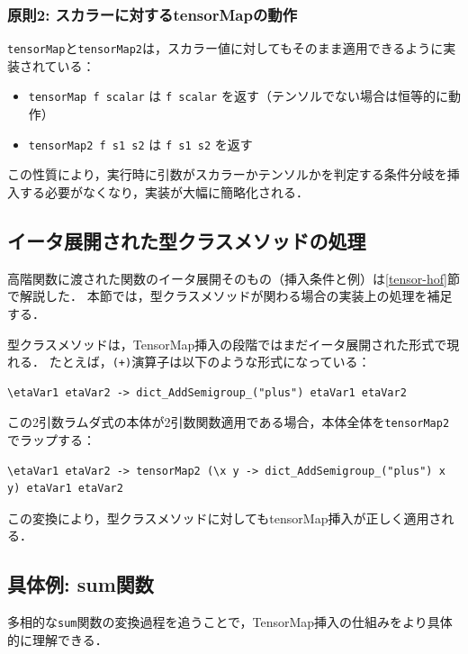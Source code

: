 \subsubsection{原則2: スカラーに対するtensorMapの動作}

\lstinline{tensorMap}と\lstinline{tensorMap2}は，スカラー値に対してもそのまま適用できるように実装されている：

\begin{itemize}
\item \lstinline{tensorMap f scalar} は \lstinline{f scalar} を返す（テンソルでない場合は恒等的に動作）
\item \lstinline{tensorMap2 f s1 s2} は \lstinline{f s1 s2} を返す
\end{itemize}

この性質により，実行時に引数がスカラーかテンソルかを判定する条件分岐を挿入する必要がなくなり，実装が大幅に簡略化される．

\subsection{イータ展開された型クラスメソッドの処理}

高階関数に渡された関数のイータ展開そのもの（挿入条件と例）は\ref{tensor-hof}節で解説した．
本節では，型クラスメソッドが関わる場合の実装上の処理を補足する．

型クラスメソッドは，TensorMap挿入の段階ではまだイータ展開された形式で現れる．
たとえば，\lstinline{(+)}演算子は以下のような形式になっている：
\begin{lstlisting}[language=egison,numbers=none]
\etaVar1 etaVar2 -> dict_AddSemigroup_("plus") etaVar1 etaVar2
\end{lstlisting}

この2引数ラムダ式の本体が2引数関数適用である場合，本体全体を\lstinline{tensorMap2}でラップする：
\begin{lstlisting}[language=egison,numbers=none]
\etaVar1 etaVar2 -> tensorMap2 (\x y -> dict_AddSemigroup_("plus") x y) etaVar1 etaVar2
\end{lstlisting}

この変換により，型クラスメソッドに対してもtensorMap挿入が正しく適用される．

\subsection{具体例: sum関数}

多相的な\lstinline{sum}関数の変換過程を追うことで，TensorMap挿入の仕組みをより具体的に理解できる．

